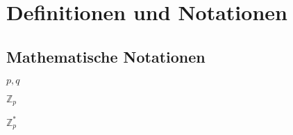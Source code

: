 \section{Definitionen und Notationen}

\label{sec_basics_definitions}


\subsection{Mathematische Notationen}

\(p,q\)

\(\mathbb{Z}_p\)

\(\mathbb{Z}_p^*\)